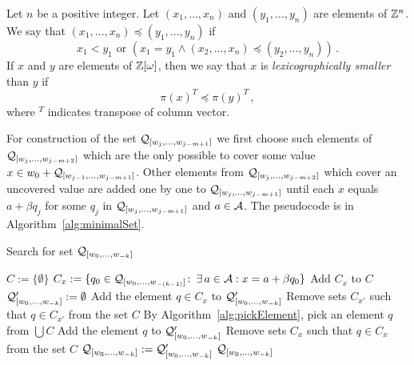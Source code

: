 \begin{defn}
\label{def:lexicographical}
Let $n$ be a positive integer. Let $(x_1, \dots, x_n)$ and $(y_1, \dots, y_n)$ are elements of $\mathbb{Z}^n$. We say that $(x_1, \dots, x_n)\preceq (y_1, \dots, y_n)$ if 
$$
x_1<y_1 \text{ or } \left(x_1=y_1 \wedge (x_2, \dots, x_n)\preceq (y_2, \dots, y_n)\right)\,.
$$
If $x$ and $y$ are elements of $\mathbb{Z}[\omega]$, then we say that $x$ is \emph{lexicographically smaller} than $y$ if
$$
\pi(x)^T \preceq \pi(y)^T\,,
$$
where $^T$ indicates transpose of column vector.
\end{defn}


\begin{upravit}
For construction of the set $\mathcal{Q}_{[w_j,\dots, w_{j-m+1}]}$ we first choose such elements of $\mathcal{Q}_{[w_j,\dots, w_{j-m+2}]}$ which are the only possible to cover some value $x \in w_0 + \mathcal{Q}_{[w_{j-1},\dots, w_{j-m+1}]}$. Other elements from $\mathcal{Q}_{[w_j,\dots, w_{j-m+2}]}$ which cover an uncovered value are added one by one to $\mathcal{Q}_{[w_j,\dots, w_{j-m+1}]}$ until each $x$ equals $a+\beta q_j$ for some $q_j$ in $\mathcal{Q}_{[w_j,\dots, w_{j-m+1}]}$ and $a\in\mathcal{A}$. The pseudocode is in Algorithm~\ref{alg:minimalSet}. 
\end{upravit}

\begin{algorithm}
  \caption{Search for set $\mathcal{Q}_{[w_{0}, \dots, w_{-k}]}$ }
    \label{alg:minimalSet}
  \begin{algorithmic}[1]
    \STATE $C:=\{\emptyset\}$
    	\STATE $C_x:= \{q_0\in\mathcal{Q}_{[w_{0}, \dots, w_{-(k-1)}]}\colon\, \exists \, a\in\mathcal{A}: x=a+\beta q_0 \}$
        \STATE Add $C_x$ to $C$
    \ENDFOR
    \STATE $\mathcal{Q}_{[w_{0}, \dots, w_{-k}]}':=\emptyset$
    		\STATE Add the element $q\in C_x$ to $\mathcal{Q}_{[w_{0}, \dots, w_{-k}]}'$
	        \STATE Remove sets $C_{x'}$ such that $q \in C_{x'}$  from the set $C$ 
	    \ENDIF
	\ENDFOR
        \STATE By Algorithm~\ref{alg:pickElement},  pick an element $q$ from $\bigcup C$
        \STATE Add the element $q$ to $\mathcal{Q}_{[w_{0}, \dots, w_{-k}]}'$
        \STATE Remove sets $C_x$ such that $q \in C_x$  from the set $C$ 
    \ENDWHILE
	\STATE $\mathcal{Q}_{[w_{0}, \dots, w_{-k}]}:=\mathcal{Q}_{[w_{0}, \dots, w_{-k}]}'$
    \RETURN $\mathcal{Q}_{[w_{0}, \dots, w_{-k}]}$
  \end{algorithmic}
\end{algorithm}


